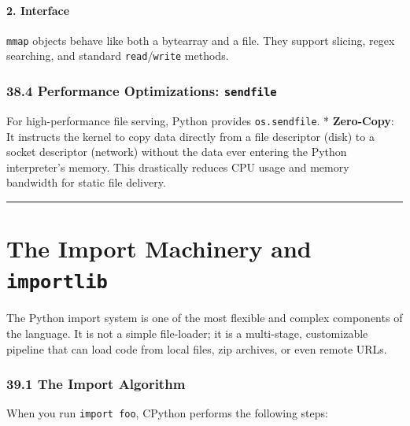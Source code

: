 \hypertarget{interface}{%
\subsubsection{2. Interface}\label{interface}}

\passthrough{\lstinline!mmap!} objects behave like both a bytearray and
a file. They support slicing, regex searching, and standard
\passthrough{\lstinline!read!}/\passthrough{\lstinline!write!} methods.

\hypertarget{performance-optimizations-sendfile}{%
\subsection{\texorpdfstring{38.4 Performance Optimizations:
\texttt{sendfile}}{38.4 Performance Optimizations: sendfile}}\label{performance-optimizations-sendfile}}

For high-performance file serving, Python provides
\passthrough{\lstinline!os.sendfile!}. * \textbf{Zero-Copy}: It
instructs the kernel to copy data directly from a file descriptor (disk)
to a socket descriptor (network) without the data ever entering the
Python interpreter's memory. This drastically reduces CPU usage and
memory bandwidth for static file delivery.

\begin{center}\rule{0.5\linewidth}{0.5pt}\end{center}

\hypertarget{the-import-machinery-and-importlib}{%
\chapter{\texorpdfstring{The Import Machinery and
\texttt{importlib}}{The Import Machinery and importlib}}\label{the-import-machinery-and-importlib}}

The Python import system is one of the most flexible and complex
components of the language. It is not a simple file-loader; it is a
multi-stage, customizable pipeline that can load code from local files,
zip archives, or even remote URLs.

\hypertarget{the-import-algorithm}{%
\subsection{39.1 The Import Algorithm}\label{the-import-algorithm}}

When you run \passthrough{\lstinline!import foo!}, CPython performs the
following steps:

